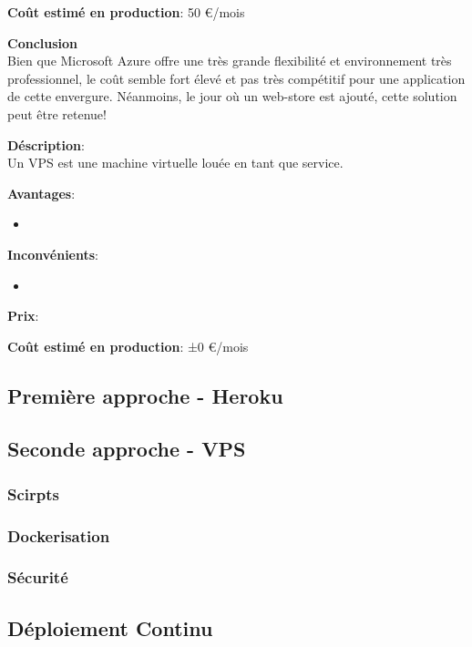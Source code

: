 \newpara
\textbf{Coût estimé en production}: 50 €/mois

\newpara
\textbf{Conclusion} \\ Bien que Microsoft Azure offre une très grande flexibilité et environnement très professionnel, le coût semble fort élevé et pas très compétitif pour une application de cette envergure. Néanmoins, le jour où un web-store est ajouté, cette solution peut être retenue!

\newpage
{}

\textbf{Déscription}: \\ Un VPS est une machine virtuelle louée en tant que service. 

\newpara
\textbf{Avantages}:
\begin{itemize}
  \item 
\end{itemize}

\newpara
\textbf{Inconvénients}:
\begin{itemize}
  \item 
\end{itemize}

\newpara
\textbf{Prix}:

\newpara
\textbf{Coût estimé en production}: ±0 €/mois

\subsection{Première approche - Heroku}
\subsection{Seconde approche - VPS}
\subsubsection{Scirpts}
\subsubsection{Dockerisation}
\subsubsection{Sécurité}


\subsection{Déploiement Continu}